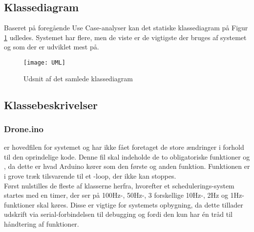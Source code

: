 \documentclass[Main]{subfiles}
\begin{document}
\subsection{Klassediagram}
Baseret på foregående Use Case-analyser kan det statiske klassediagram på Figur \ref{Fig:UML} udledes.
Systemet har flere, men de viste er de vigtigste der bruges af systemet og som der er udviklet mest på.


\begin{figure}[H]
\centering
\texttt{[image: UML]}
\caption{Udsnit af det samlede klassediagram}
\label{Fig:UML}
\end{figure}

\newpage
\subsection{Klassebeskrivelser}
\subsubsection{Drone.ino}
 er hovedfilen for systemet og har ikke fået foretaget de store ændringer i forhold til den oprindelige kode.
Denne fil skal indeholde de to obligatoriske funktioner  og , da dette er hvad Arduino kører som den første og anden funktion.
Funktionen  er i grove træk tilsvarende til et -loop, der ikke kan stoppes.
\\
Først nulstilles de fleste af klasserne herfra, hvorefter et schedulerings-system startes med en timer, der ser på 100Hz-, 50Hz-, 3 forskellige 10Hz-, 2Hz og 1Hz-funktioner skal køres. 
Disse er vigtige for systemets opbygning, da dette tillader udskrift via serial-forbindelsen til debugging og fordi den kun har én tråd til håndtering af funktioner.

\begin{Function}
\end{Function}


\begin{Function}
\end{Function}


\begin{Function}
\end{Function}
\end{document}

